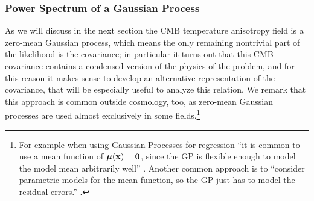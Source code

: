 \subsubsection{Power Spectrum of a Gaussian Process} %
As we will discuss in the next section the CMB temperature anisotropy field is a zero-mean Gaussian process, which means the only remaining nontrivial part of the likelihood is the covariance; in particular it turns out that this CMB covariance contains a condensed version of the physics of the problem, and for this reason it makes sense to develop an alternative representation of the covariance, that will be especially useful to analyze this relation. We remark that this approach is common outside cosmology, too, as zero-mean Gaussian processes are used almost exclusively in some fields.\footnote{For example when using Gaussian Processes for regression ``it is common to use a mean function of $\vb*{\mu}(\vb{x}) = \vb{0}$, since the GP is flexible enough to model the model mean arbitrarily well'' \cite{ml_probabilistic_perspective}. Another common approach is to ``consider parametric models for the mean function, so the GP just has to model the residual errors.'' \cite{ml_probabilistic_perspective}.}

